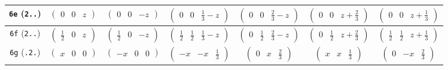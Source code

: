 \documentclass[fleqn,9pt,landscape]{jsarticle}
\begin{document}
\begin{center}
\begin{longtable}{ccccccc}
{\tt 6e} ({\tt 2..}) & $ \begin{pmatrix} 0 & 0 & z \end{pmatrix} $ & $ \begin{pmatrix} 0 & 0 & - z \end{pmatrix} $ & $ \begin{pmatrix} 0 & 0 & \frac{1}{3} - z \end{pmatrix} $ & $ \begin{pmatrix} 0 & 0 & \frac{2}{3} - z \end{pmatrix} $ & $ \begin{pmatrix} 0 & 0 & z + \frac{2}{3} \end{pmatrix} $ & $ \begin{pmatrix} 0 & 0 & z + \frac{1}{3} \end{pmatrix} $ \\ \hline
{\tt 6f} ({\tt 2..}) & $ \begin{pmatrix} \frac{1}{2} & 0 & z \end{pmatrix} $ & $ \begin{pmatrix} \frac{1}{2} & 0 & - z \end{pmatrix} $ & $ \begin{pmatrix} \frac{1}{2} & \frac{1}{2} & \frac{1}{3} - z \end{pmatrix} $ & $ \begin{pmatrix} 0 & \frac{1}{2} & \frac{2}{3} - z \end{pmatrix} $ & $ \begin{pmatrix} 0 & \frac{1}{2} & z + \frac{2}{3} \end{pmatrix} $ & $ \begin{pmatrix} \frac{1}{2} & \frac{1}{2} & z + \frac{1}{3} \end{pmatrix} $ \\ \hline
{\tt 6g} ({\tt .2.}) & $ \begin{pmatrix} x & 0 & 0 \end{pmatrix} $ & $ \begin{pmatrix} - x & 0 & 0 \end{pmatrix} $ & $ \begin{pmatrix} - x & - x & \frac{1}{3} \end{pmatrix} $ & $ \begin{pmatrix} 0 & x & \frac{2}{3} \end{pmatrix} $ & $ \begin{pmatrix} x & x & \frac{1}{3} \end{pmatrix} $ & $ \begin{pmatrix} 0 & - x & \frac{2}{3} \end{pmatrix} $ \\ \hline

\end{longtable}
\end{center}
\end{document}
